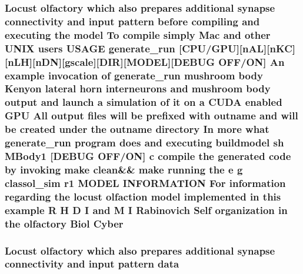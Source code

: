 \hypertarget{userproject_2MBody1__project_2README_8txt_a5195ea7b2f973c20c789f376b5b584fa}{
\subsubsection[{Cyber}]{\setlength{\rightskip}{0pt plus 5cm}Locust olfactory which also prepares additional synapse connectivity and input pattern before compiling and executing the {\bf model} To compile simply Mac and other U\+N\+I\+X users U\+S\+A\+G\+E {\bf generate\+\_\+run} \mbox{[}{\bf C\+P\+U}/{\bf G\+P\+U}\mbox{]}\mbox{[}n\+A\+L\mbox{]}\mbox{[}n\+K\+C\mbox{]}\mbox{[}n\+L\+H\mbox{]}\mbox{[}n\+D\+N\mbox{]}\mbox{[}gscale\mbox{]}\mbox{[}D\+I\+R\mbox{]}\mbox{[}M\+O\+D\+E\+L\mbox{]}\mbox{[}D\+E\+B\+U\+G O\+F\+F/O\+N\mbox{]} An example invocation of {\bf generate\+\_\+run} mushroom body Kenyon lateral horn {\bf interneurons} and mushroom body output and launch a simulation of {\bf it} on a C\+U\+D\+A enabled {\bf G\+P\+U} All output files will be prefixed {\bf with} outname and will be created under the outname {\bf directory} In more what {\bf generate\+\_\+run} program does and executing buildmodel sh M\+Body1 \mbox{[}D\+E\+B\+U\+G O\+F\+F/O\+N\mbox{]} c compile the generated {\bf code} by invoking make clean\&\& make running the e g classol\+\_\+sim r1 M\+O\+D\+E\+L I\+N\+F\+O\+R\+M\+A\+T\+I\+O\+N For information regarding the locust olfaction {\bf model} implemented {\bf in} this example {\bf R} H D I and M I Rabinovich Self organization {\bf in} the olfactory Biol Cyber}}\label{userproject_2MBody1__project_2README_8txt_a5195ea7b2f973c20c789f376b5b584fa}
\hypertarget{userproject_2MBody1__project_2README_8txt_a061ab0b3ed4015ddc94b25da6fabc3ed}{
\subsubsection[{data}]{\setlength{\rightskip}{0pt plus 5cm}Locust olfactory which also prepares additional synapse connectivity and input pattern data}}\label{userproject_2MBody1__project_2README_8txt_a061ab0b3ed4015ddc94b25da6fabc3ed}
